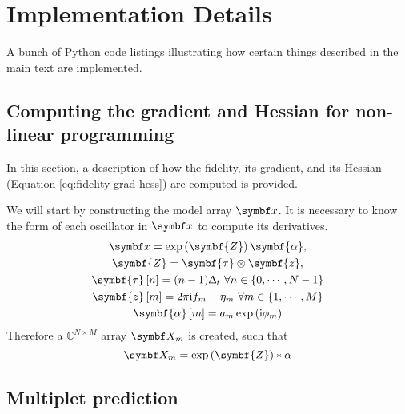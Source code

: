 \chapter{Implementation Details}

A bunch of Python code listings illustrating how certain things described in
the main text are implemented.

\section{Computing the gradient and Hessian for non-linear programming}

In this section, a description of how the fidelity, its gradient, and its
Hessian (Equation \ref{eq:fidelity-grad-hess}) are computed is provided.


We will start by constructing the model array $\bx$. It is necessary to know
the form of each oscillator in $\bx$ to compute its derivatives.
\begin{subequations}
    \begin{gather}
        \bx = \exp\left(\symbf{Z}\right) \symbf{\alpha},\\
        \symbf{Z} = \symbf{\tau} \otimes \symbf{z},\\
        \symbf{\tau}\left[n\right] = (n-1)\Dt\ \forall n \in \lbrace0, \cdots, N - 1\rbrace\\
        \symbf{z}\left[m\right] = 2 \pi \iu f_m- \eta_m\ \forall m \in \lbrace 1, \cdots, M \rbrace\\
        \symbf{\alpha}\left[m\right] = a_m \exp\left(\iu \phi_m\right)
    \end{gather}
\end{subequations}
Therefore a $\mathbb{C}^{N \times M}$ array $\bX_m$ is created, such that
\begin{equation}
    \bX_m = \exp\left(\symbf{Z}\right) * \alpha
\end{equation}




\section{Multiplet prediction}
\label{sec:multiplet prediction}

